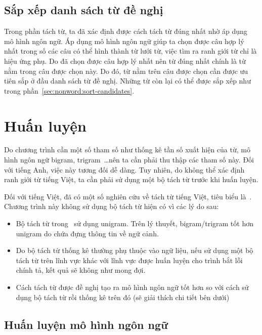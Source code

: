 \documentclass[a4paper,oneside,14pt]{extbook} %
\begin{document}




\subsection{Sắp xếp danh sách từ đề nghị}
\label{sec:realword:sort-candidates}

Trong phần tách từ, ta đã xác định được cách tách từ đúng nhất nhờ áp
dụng mô hình ngôn ngữ. Áp dụng mô hình ngôn ngữ giúp ta chọn được câu
hợp lý nhất trong số các câu có thể hình thành từ lưới từ, việc tìm ra
ranh giới từ chỉ là hiệu ứng phụ. Do đã chọn được câu hợp lý nhất nên
từ đúng nhất chính là từ nằm trong câu được chọn này. Do đó, từ nằm
trên câu được chọn cần được ưu tiên sắp ở đầu danh sách từ đề
nghị. Những từ còn lại có thể được sắp xếp như trong
phần~\ref{sec:nonword:sort-candidates}.

\section{Huấn luyện}
\label{sec:training}

Do chương trình cần một số tham số như thống kê tần số xuất hiện của
từ, mô hình ngôn ngữ bigram, trigram~\ldots nên ta cần phải thu thập
các tham số này. Đối với tiếng Anh, việc này tương đối dễ dàng. Tuy
nhiên, do không thể xác định ranh giới từ tiếng Việt, ta cần phải sử
dụng một bộ tách từ trước khi huấn luyện.

Đối với tiếng Việt, đã có một số nghiên cứu về tách từ tiếng Việt,
tiêu biểu là~\cite{Tachtu}. Chương trình này không sử dụng bộ tách từ
hiện có vì các lý do sau:
\begin{itemize}
\item Bộ tách từ trong~\cite{Tachtu} sử dụng unigram. Trên lý thuyết,
  bigram/trigram tốt hơn unigram do chứa đựng thông tin về ngữ cảnh.
\item Do bộ tách từ thống kê thường phụ thuộc vào ngữ liệu, nếu sử
  dụng một bộ tách từ trên lĩnh vực khác với lĩnh vực được huấn luyện
  cho trình bắt lỗi chính tả, kết quả sẽ không như mong đợi.
\item Cách tách từ được đề nghị tạo ra mô hình ngôn ngữ tốt hơn so với
  cách sử dụng bộ tách từ rồi thống kê trên đó (sẽ giải thích chi tiết
  bên dưới)
\end{itemize}

\subsection{Huấn luyện mô hình ngôn ngữ}
\end{document}
